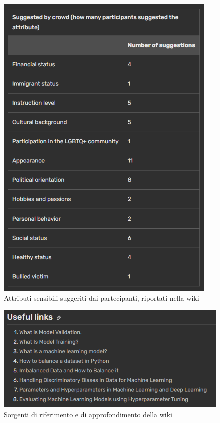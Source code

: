 \begin{figure}[h!]
    \centering
    \includegraphics[width=300pt]{figure/catalog/suggests.png}
    \caption{Attributi sensibili suggeriti dai partecipanti, riportati nella wiki}
    \label{wiki-suggestions}
\end{figure}

\begin{figure}[h!]
    \centering
    \includegraphics[width=360pt]{figure/catalog/links.png}
    \caption{Sorgenti di riferimento e di approfondimento della wiki}
    \label{wiki-links}
\end{figure}


